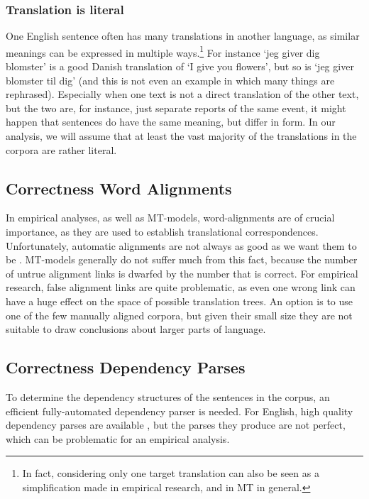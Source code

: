 \documentclass[hidelinks]{report}
\begin{document}
\subsubsection{Translation is literal}
One English sentence often has many translations in another language, as similar meanings can be expressed in multiple ways.\footnote{In fact, considering only one target translation can also be seen as a simplification made in empirical research, and in MT in general.} For instance `jeg giver dig blomster' is a good Danish translation of `I give you flowers', but so is `jeg giver blomster til dig' (and this is not even an example in which many things are rephrased). Especially when one text is not a direct translation of the other text, but the two are, for instance, just separate reports of the same event, it might happen that sentences do have the same meaning, but differ in form. In our analysis, we will assume that at least the vast majority of the translations in the corpora are rather literal.
 
\subsection{Correctness Word Alignments}

In empirical analyses, as well as MT-models, word-alignments are of crucial importance, as they are used to establish translational correspondences. Unfortunately, automatic alignments are not always as good as we want them to be \citep[see][for concrete numbers]{och2000improved}. MT-models generally do not suffer much from this fact, because the number of untrue alignment links is dwarfed by the number that is correct. For empirical research, false alignment links are quite problematic, as even one wrong link can have a huge effect on the space of possible translation trees. An option is to use one of the few manually aligned corpora, but given their small size they are not suitable to draw conclusions about larger parts of language.

\subsection{Correctness Dependency Parses}

To determine the dependency structures of the sentences in the corpus, an efficient fully-automated dependency parser is needed.  For English, high quality dependency parses are available \citep{cer2010parsing}, but the parses they produce are not perfect, which can be problematic for an empirical analysis.
\end{document}
